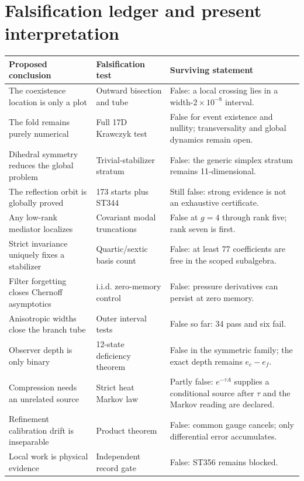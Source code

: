 \documentclass[11pt,a4paper]{article}
\begin{document}
\section{Falsification ledger and present interpretation}

\begin{longtable}{p{}p{}p{}}
\toprule Proposed conclusion&Falsification test&Surviving statement\\\midrule\endhead
The coexistence location is only a plot&Outward bisection and tube&False: a local crossing lies in a width-$2\times10^{-8}$ interval.\\
The fold remains purely numerical&Full 17D Krawczyk test&False for event existence and nullity; transversality and global dynamics remain open.\\
Dihedral symmetry reduces the global problem&Trivial-stabilizer stratum&False: the generic simplex stratum remains 11-dimensional.\\
The reflection orbit is globally proved&173 starts plus ST344&Still false: strong evidence is not an exhaustive certificate.\\
Any low-rank mediator localizes&Covariant modal truncations&False at $g=4$ through rank five; rank seven is first.\\
Strict invariance uniquely fixes a stabilizer&Quartic/sextic basis count&False: at least 77 coefficients are free in the scoped subalgebra.\\
Filter forgetting closes Chernoff asymptotics&i.i.d. zero-memory control&False: pressure derivatives can persist at zero memory.\\
Anisotropic widths close the branch tube&Outer interval tests&False so far: 34 pass and six fail.\\
Observer depth is only binary&12-state deficiency theorem&False in the symmetric family; the exact depth remains $e_c-e_f$.\\
Compression needs an unrelated source&Strict heat Markov law&Partly false: $e^{-\tau A}$ supplies a conditional source after $\tau$ and the Markov reading are declared.\\
Refinement calibration drift is inseparable&Product theorem&False: common gauge cancels; only differential error accumulates.\\
Local work is physical evidence&Independent record gate&False: ST356 remains blocked.\\
\bottomrule
\end{longtable}
\end{document}

